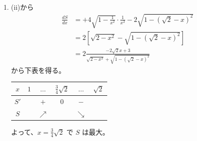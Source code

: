 \documentclass[../main.tex]{subfiles}
\begin{document}
\begin{enumerate}
    \[
      S = \pi - 2F\left(\frac{1}{x}\right) - F(\sqrt{2} - x)
    \]

  \item[(iii)] (ii)から
    \begin{align*}
      \frac{dS}{dx} &= +4 \sqrt{1 - \frac{1}{x^2}} \cdot \frac{1}{x^2} - 2\sqrt{1 - (\sqrt{2}-x)^2} \\
      &= 2 \left[ \sqrt{2 - x^2} - \sqrt{1 - (\sqrt{2}-x)^2} \right] \\
      &= 2 \frac{-2\sqrt{2}x + 3}{\sqrt{2-x^2} + \sqrt{1 - (\sqrt{2}-x)^2}}
    \end{align*}
    から下表を得る。

    \begin{center}
      \begin{tabular}{c|c|c|c|c|c}
        $x$ & $1$ & $\dots$ & $\frac{3}{4}\sqrt{2}$ & $\dots$ & $\sqrt{2}$ \\ \hline
        $S'$ & & $+$ & $0$ & $-$ & \\ \hline
        $S$ & & $\nearrow$ & & $\searrow$ &
      \end{tabular}
    \end{center}

    よって、$x = \frac{3}{4}\sqrt{2}$ で $S$ は最大。
\end{enumerate}
\end{document}
